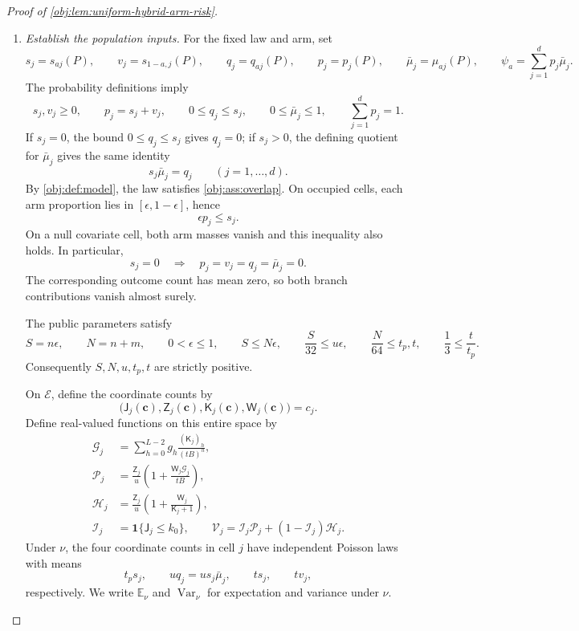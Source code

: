 \begin{proof}[Proof of \cref{obj:lem:uniform-hybrid-arm-risk}]
\begin{enumerate}
\item \textit{Establish the population inputs.}
For the fixed law and arm, set
\begingroup\footnotesize
\[
s_j=s_{aj}(P),\qquad
v_j=s_{1-a,j}(P),\qquad
q_j=q_{aj}(P),\qquad
p_j=p_j(P),\qquad
\bar\mu_j=\mu_{aj}(P),
\qquad
\psi_a=\sum_{j=1}^dp_j\bar\mu_j.
\]
\endgroup
The probability definitions imply
\[
s_j,v_j\ge0,\qquad
p_j=s_j+v_j,\qquad
0\le q_j\le s_j,\qquad
0\le\bar\mu_j\le1,\qquad
\sum_{j=1}^dp_j=1.
\]
If \(s_j=0\), the bound \(0\le q_j\le s_j\) gives \(q_j=0\); if \(s_j>0\), the defining quotient for \(\bar\mu_j\) gives the same identity
\[
s_j\bar\mu_j=q_j
\qquad(j=1,\ldots,d).
\]
By \cref{obj:def:model}, the law satisfies \cref{obj:ass:overlap}. On occupied cells, each arm proportion lies in \([\epsilon,1-\epsilon]\), hence
\[
\epsilon p_j\le s_j.
\]
On a null covariate cell, both arm masses vanish and this inequality also holds. In particular,
\[
s_j=0\quad\Longrightarrow\quad
p_j=v_j=q_j=\bar\mu_j=0.
\]
The corresponding outcome count has mean zero, so both branch contributions vanish almost surely.

The public parameters satisfy
\begingroup\small
\[
S=n\epsilon,\qquad N=n+m,\qquad
0<\epsilon\le1,\qquad
S\le N\epsilon,\qquad
\frac S{32}\le u\epsilon,\qquad
\frac N{64}\le t_p,t,\qquad
\frac13\le\frac t{t_p}.
\]
\endgroup
Consequently \(S,N,u,t_p,t\) are strictly positive.

On \(\mathcal E\), define the coordinate counts by
\[
\bigl(\mathsf J_j(\boldsymbol c),\mathsf Z_j(\boldsymbol c),
\mathsf K_j(\boldsymbol c),\mathsf W_j(\boldsymbol c)\bigr)=c_j.
\]
Define real-valued functions on this entire space by
\[
\begin{aligned}
\mathcal G_j
&=\sum_{h=0}^{L-2}g_h\frac{(\mathsf K_j)_h}{(tB)^h},\\
\mathcal P_j
&=\frac{\mathsf Z_j}{u}
\left(1+\frac{\mathsf W_j\mathcal G_j}{tB}\right),\\
\mathcal H_j
&=\frac{\mathsf Z_j}{u}
\left(1+\frac{\mathsf W_j}{\mathsf K_j+1}\right),\\
\mathcal I_j&=\mathbf1\{\mathsf J_j\le k_0\},\qquad
\mathcal V_j=\mathcal I_j\mathcal P_j+(1-\mathcal I_j)\mathcal H_j.
\end{aligned}
\]
Under \(\nu\), the four coordinate counts in cell \(j\) have independent Poisson laws with means
\[
t_ps_j,\qquad uq_j=us_j\bar\mu_j,\qquad ts_j,\qquad tv_j,
\]
respectively. We write \(\mathbb E_\nu\) and \(\operatorname{Var}_\nu\) for expectation and variance under \(\nu\).


\end{enumerate}
\end{proof}
